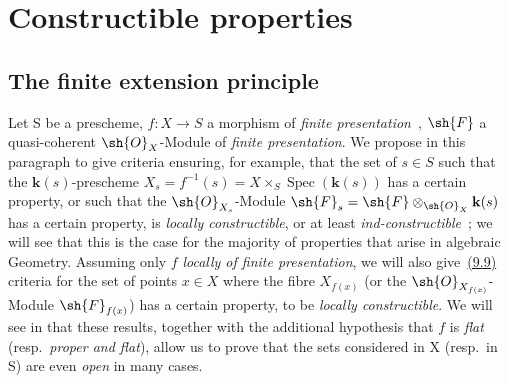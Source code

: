 \section{Constructible properties}
\label{section:IV.9}

\subsection{The finite extension principle}
\label{subsection:IV.9.1}

Let S be a prescheme, $f:X\to S$ a morphism of \emph{finite presentation}~,
$\sh{F}$ a quasi-coherent $\sh{O}_X$-Module of \emph{finite presentation}.
We propose in this paragraph to give criteria ensuring, for example, that the set of $s\in S$ such that the $\mathbf{k}(s)$-prescheme $X_s=f^{-1}(s)=X\times_S\operatorname{Spec}(\mathbf{k}(s))$ has a certain property, or such that the $\sh{O}_{X_s}$-Module $\sh{F}_s=\sh{F}\otimes_{\sh{O}_X}\mathbf{k}(s)$ has a certain property, is \emph{locally constructible}, or at least \emph{ind-constructible}~; we will see that this is the case for the majority of properties that arise in algebraic Geometry.
Assuming only $f$ \emph{locally of finite presentation}, we will also give~{\hyperlink{ega4.c04.subsec.9-9}{(9.9)}} criteria for the set of points $x\in X$ where the fibre $X_{f(x)}$ (or the $\sh{O}_{X_{f(x)}}$-Module $\sh{F}_{f(x)}$) has a certain property, to be \emph{locally constructible}.
We will see in  that these results, together with the additional hypothesis that $f$ is \emph{flat} (resp.\ \emph{proper and flat}), allow us to prove that the sets considered in X (resp.\ in S) are even \emph{open} in many cases.

